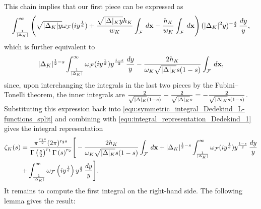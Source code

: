       This chain implies that our first piece can be expressed as
      \[
        \int_{\frac{1}{|\Delta_{K}|}}^{\infty}\left(\sqrt{|\Delta_{K}|y}\omega_{\mathcal{F}}(iy^{\frac{1}{d}})+\frac{\sqrt{|\Delta|_{K}y}h_{K}}{w_{K}}\int_{\mathcal{F}}\,d\mathbf{x}-\frac{h_{K}}{w_{K}}\int_{\mathcal{F}}\,d\mathbf{x}\right)(|\Delta_{K}|^{2}y)^{-\frac{s}{2}}\,\frac{dy}{y},
      \]
      which is further equivalent to
      \[
        |\Delta_{K}|^{\frac{1}{2}-s}\int_{\frac{1}{|\Delta_{K}|}}^{\infty}\omega_{\mathcal{F}}(iy^{\frac{1}{d}})y^{\frac{1-s}{2}}\,\frac{dy}{y}-\frac{2h_{K}}{\omega_{K}\sqrt{|\Delta|_{K}}s(1-s)}\int_{\mathcal{F}}\,d\mathbf{x},
      \]
      since, upon interchanging the integrals in the last two pieces by the Fubini–Tonelli theorem, the inner integrals are $\frac{2}{\sqrt{|\Delta|_{K}}(1-s)}-\frac{2}{\sqrt{|\Delta|_{K}}s} = -\frac{2}{\sqrt{|\Delta|_{K}}s(1-s)}$. Substituting this expression back into \cref{equ:symmetric_integral_Dedekind_L-functions_split} and combining with \cref{equ:integral_representation_Dedekind_1} gives the integral representation
      \begin{align*}
        \zeta_{K}(s) &= \frac{\pi^{\frac{r_{1}s}{2}}(2\pi)^{r_{2}s}}{\Gamma\left(\frac{s}{2}\right)^{r_{1}}\Gamma\left(s\right)^{r_{2}}}\Bigg[-\frac{2h_{K}}{\omega_{K}\sqrt{|\Delta|_{K}}s(1-s)}\int_{\mathcal{F}}\,d\mathbf{x}+|\Delta_{K}|^{\frac{1}{2}-s}\int_{\frac{1}{|\Delta_{K}|}}^{\infty}\omega_{\mathcal{F}}(iy^{\frac{1}{d}})y^{\frac{1-s}{2}}\,\frac{dy}{y} \\
        &+ \int_{\frac{1}{|\Delta_{K}|}}^{\infty}\omega_{\mathcal{F}}\left(iy^{\frac{1}{d}}\right)y^{\frac{s}{2}}\,\frac{dy}{y}\Bigg].
      \end{align*}
      It remains to compute the first integral on the right-hand side. The following lemma gives the result:

